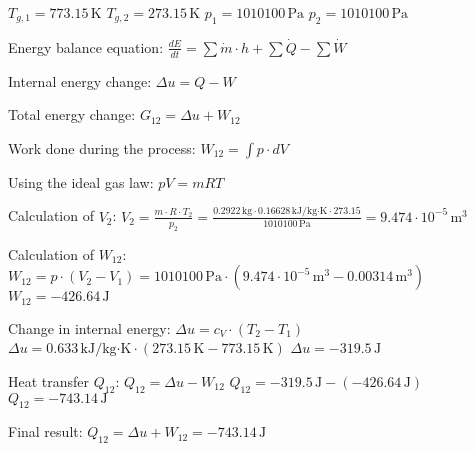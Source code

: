 \( T_{g,1} = 773.15 \, \text{K} \)  
\( T_{g,2} = 273.15 \, \text{K} \)  
\( p_1 = 1010100 \, \text{Pa} \)  
\( p_2 = 1010100 \, \text{Pa} \)  

Energy balance equation:  
\( \frac{dE}{dt} = \sum \dot{m} \cdot h + \sum \dot{Q} - \sum \dot{W} \)  

Internal energy change:  
\( \Delta u = Q - W \)  

Total energy change:  
\( G_{12} = \Delta u + W_{12} \)  

Work done during the process:  
\( W_{12} = \int p \cdot dV \)  

Using the ideal gas law:  
\( pV = mRT \)  

Calculation of \( V_2 \):  
\( V_2 = \frac{m \cdot R \cdot T_2}{p_2} = \frac{0.2922 \, \text{kg} \cdot 0.16628 \, \text{kJ/kg·K} \cdot 273.15}{1010100 \, \text{Pa}} = 9.474 \cdot 10^{-5} \, \text{m}^3 \)  

Calculation of \( W_{12} \):  
\( W_{12} = p \cdot (V_2 - V_1) = 1010100 \, \text{Pa} \cdot (9.474 \cdot 10^{-5} \, \text{m}^3 - 0.00314 \, \text{m}^3) \)  
\( W_{12} = -426.64 \, \text{J} \)  

Change in internal energy:  
\( \Delta u = c_V \cdot (T_2 - T_1) \)  
\( \Delta u = 0.633 \, \text{kJ/kg·K} \cdot (273.15 \, \text{K} - 773.15 \, \text{K}) \)  
\( \Delta u = -319.5 \, \text{J} \)  

Heat transfer \( Q_{12} \):  
\( Q_{12} = \Delta u - W_{12} \)  
\( Q_{12} = -319.5 \, \text{J} - (-426.64 \, \text{J}) \)  
\( Q_{12} = -743.14 \, \text{J} \)  

Final result:  
\( Q_{12} = \Delta u + W_{12} = -743.14 \, \text{J} \)